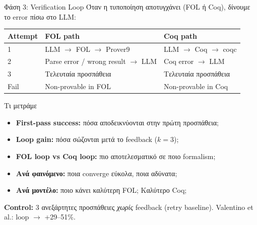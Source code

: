 \documentclass[aspectratio=169,10pt]{beamer}
\begin{document}
\begin{frame}{Φάση 3: Verification Loop}
	Όταν η τυποποίηση αποτυγχάνει (FOL ή Coq), δίνουμε το error πίσω στο LLM:

	\vspace{0.3cm}
	\begin{center}
		\footnotesize
		\begin{tabular}{l l l}
			\toprule
			\textbf{Attempt} & \textbf{FOL path} & \textbf{Coq path} \\
			\midrule
			1 & LLM $\to$ FOL $\to$ Prover9 & LLM $\to$ Coq $\to$ coqc \\
			2 & Parse error / wrong result $\to$ LLM & Coq error $\to$ LLM \\
			3 & Τελευταία προσπάθεια & Τελευταία προσπάθεια \\
			Fail & Non-provable in FOL & Non-provable in Coq \\
			\bottomrule
		\end{tabular}
	\end{center}

	\vspace{0.3cm}
	\begin{block}{Τι μετράμε}
		\begin{itemize}
			\item \textbf{First-pass success:} πόσα αποδεικνύονται στην πρώτη προσπάθεια;
			\item \textbf{Loop gain:} πόσα σώζονται μετά το feedback ($k=3$);
			\item \textbf{FOL loop vs Coq loop:} πιο αποτελεσματικό σε ποιο formalism;
			\item \textbf{Ανά φαινόμενο:} ποια converge εύκολα, ποια αδύνατα;
			\item \textbf{Ανά μοντέλο:} ποιο κάνει καλύτερη FOL; Καλύτερο Coq;
		\end{itemize}
	\end{block}

	\vspace{0.2cm}
	\textbf{Control:} 3 ανεξάρτητες προσπάθειες \textit{χωρίς} feedback (retry baseline). Valentino et al.: loop $\to$ +29--51\%.
\end{frame}
\end{document}
